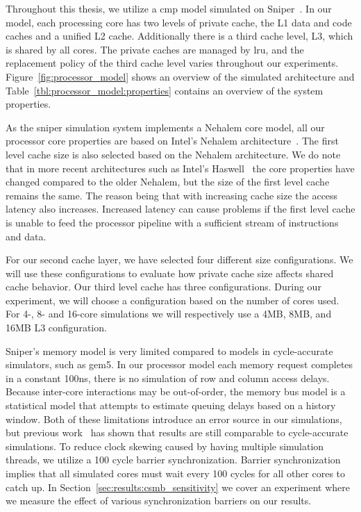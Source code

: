 Throughout this thesis, we utilize a \gls{cmp} model simulated on Sniper~\cite{Carlson2011a}. 
In our model, each processing core has two levels of private cache, the L1 data and code caches and a unified L2 cache.
Additionally there is a third cache level, L3, which is shared by all cores. 
The private caches are managed by \gls{lru}, and the replacement policy of the third cache level varies throughout our experiments.
Figure~\ref{fig:processor_model} shows an overview of the simulated architecture and Table~\ref{tbl:processor_model:properties} contains an overview of the system properties.

As the sniper simulation system implements a Nehalem core model, all our processor core properties are based on Intel's Nehalem architecture~\cite{Thomadakis2011}. 
The first level cache size is also selected based on the Nehalem architecture. 
We do note that in more recent architectures such as Intel's Haswell~\cite{Jain2013} the core properties have changed compared to the older Nehalem, but the size of the first level cache remains the same.
The reason being that with increasing cache size the access latency also increases. 
Increased latency can cause problems if the first level cache is unable to feed the processor pipeline with a sufficient stream of instructions and data.

For our second cache layer, we have selected four different size configurations.
We will use these configurations to evaluate how private cache size affects shared cache behavior.
Our third level cache has three configurations.
During our experiment, we will choose a configuration based on the number of cores used.
For 4-, 8- and 16-core simulations we will respectively use a 4MB, 8MB, and 16MB L3 configuration.

Sniper's memory model is very limited compared to models in cycle-accurate simulators, such as gem5.
In our processor model each memory request completes in a constant 100ns, there is no simulation of row and column access delays.
Because inter-core interactions may be out-of-order, the memory bus model is a statistical model that attempts to estimate queuing delays based on a history window.
Both of these limitations introduce an error source in our simulations, but previous work~\cite{Carlson2011a, Olsen2014} has shown that results are still comparable to cycle-accurate simulations.
To reduce clock skewing caused by having multiple simulation threads, we utilize a 100 cycle barrier synchronization.
Barrier synchronization implies that all simulated cores must wait every 100 cycles for all other cores to catch up.
In Section~\ref{sec:results:csmb_sensitivity} we cover an experiment where we measure the effect of various synchronization barriers on our results.

